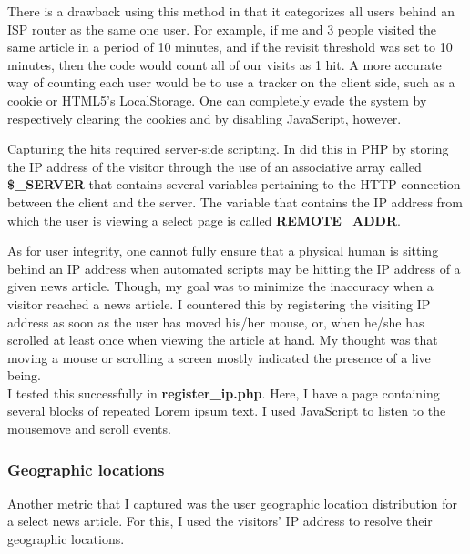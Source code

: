 \documentclass[12pt]{article}
\begin{document}
\noindent There is a drawback using this method in that it categorizes all users behind an ISP router as the same one user. For example, if me and 3 people visited the same article in a period of 10 minutes, and if the revisit threshold was set to 10 minutes, then the code would count all of our visits as 1 hit. A more accurate way of counting each user would be to use a tracker on the client side, such as a cookie or HTML5's LocalStorage. One can completely evade the system by respectively clearing the cookies and by disabling JavaScript, however. 

Capturing the hits required server-side scripting. In did this in PHP by storing the IP address of the visitor through the use of an associative array called \textbf{\$\_SERVER} that contains several variables pertaining to the HTTP connection between the client and the server. The variable that contains the IP address from which the user is viewing a select page is called \textbf{REMOTE\_ADDR}. 

As for user integrity, one cannot fully ensure that a physical human is sitting behind an IP address when automated scripts may be hitting the IP address of a given news article. Though, my goal was to minimize the inaccuracy when a visitor reached a news article. I countered this by registering the visiting IP address as soon as the user has moved his/her mouse, or, when he/she has scrolled at least once when viewing the article at hand. My thought was that moving a mouse or scrolling a screen mostly indicated the presence of a live being. \\ 
I tested this successfully in \textbf{register\_ip.php}. Here, I have a page containing several blocks of repeated Lorem ipsum text. I used JavaScript to listen to the mousemove and scroll events.

\newpage

\subsubsection{Geographic locations}
Another metric that I captured was the user geographic location distribution for a select news article. For this, I used the visitors' IP address to resolve their geographic locations.
\end{document}
